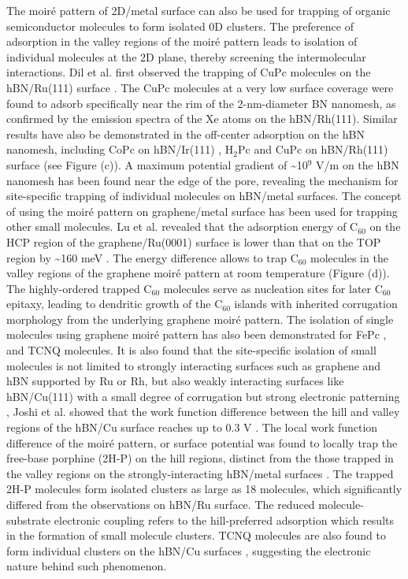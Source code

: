 The moiré pattern of 2D/metal surface can also be used for trapping
of organic semiconductor molecules to form isolated 0D clusters. The
preference of adsorption in the valley regions of the moiré pattern
leads to isolation of individual molecules at the 2D plane, thereby
screening the intermolecular interactions. Dil et al. first observed
the trapping of CuPc molecules on the hBN/Ru(111) surface
\cite{Dil_2008_hBN_Rh}. The CuPc molecules at a very low surface
coverage were found to adsorb specifically near the rim of the
2-nm-diameter BN nanomesh, as confirmed by the emission spectra of the
Xe atoms on the hBN/Rh(111). Similar results have also be demonstrated
in the off-center adsorption on the hBN nanomesh, including CoPc on
hBN/Ir(111) \cite{Schulz_2013_copc_hbn_moire}, H\(_{\text{2}}\)Pc and CuPc on
hBN/Rh(111) surface \cite{Iannuzzi_2014_MPc_hBN_Rh} (see Figure
(c)). A maximum potential gradient of \textasciitilde{}10\(^{\text{9}}\) V/m on the hBN
nanomesh has been found near the edge of the pore, revealing the
mechanism for site-specific trapping of individual molecules on
hBN/metal surfaces. The concept of using the moiré pattern on
graphene/metal surface has been used for trapping other small
molecules. Lu et al. revealed that the adsorption energy of C\(_{\text{60}}\) on
the HCP region of the graphene/Ru(0001) surface is lower than that on
the TOP region by \textasciitilde{}160 meV \cite{Lu_2012_c60_gr_moire}. The energy
difference allows to trap C\(_{\text{60}}\) molecules in the valley regions of
the graphene moiré pattern at room temperature (Figure
(d)). The highly-ordered trapped C\(_{\text{60}}\) molecules serve as
nucleation sites for later C\(_{\text{60}}\) epitaxy, leading to dendritic growth
of the C\(_{\text{60}}\) islands with inherited corrugation morphology from the
underlying graphene moiré pattern. The isolation of single molecules
using graphene moiré pattern has also been demonstrated for FePc
\cite{Zhang_2011_FePc_gr}, and TCNQ \cite{Maccariello_2014_TCNQ_gr_Ru}
molecules. It is also found that the site-specific isolation of small
molecules is not limited to strongly interacting surfaces such as
graphene and hBN supported by Ru or Rh, but also weakly interacting
surfaces like hBN/Cu(111) with a small degree of corrugation but
strong electronic patterning
\cite{Joshi_2012_hBN_Cu,Joshi_2014_TCNQ_hBN}, Joshi et al. showed that
the work function difference between the hill and valley regions of
the hBN/Cu surface reaches up to 0.3 V \cite{Joshi_2012_hBN_Cu}. The
local work function difference of the moiré pattern, or surface
potential was found to locally trap the free-base porphine (2H-P) on
the hill regions, distinct from the those trapped in the valley
regions on the strongly-interacting hBN/metal surfaces
\cite{Dil_2008_hBN_Rh,Schulz_2013_copc_hbn_moire,Iannuzzi_2014_MPc_hBN_Rh}. The
trapped 2H-P molecules form isolated clusters as large as 18
molecules, which significantly differed from the observations on
hBN/Ru surface. The reduced molecule-substrate electronic coupling
refers to the hill-preferred adsorption which results in the formation
of small molecule clusters. TCNQ molecules are also found to form
individual clusters on the hBN/Cu surfaces \cite{Joshi_2014_TCNQ_hBN},
suggesting the electronic nature behind such phenomenon.


